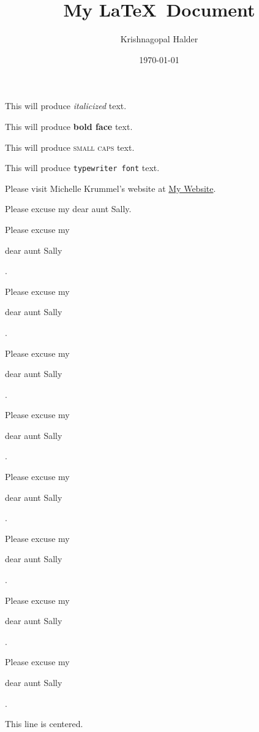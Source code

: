 \documentclass[12pt]{article}
\title{My \LaTeX\ Document}
\author{Krishnagopal Halder}
\date{\today}
\begin{document}
\tableofcontents
\maketitle

This will produce \textit{italicized} text.

This will produce \textbf{bold face} text.

This will produce \textsc{small caps} text.

This will produce \texttt{typewriter font} text.

Please visit Michelle Krummel's website at \href{http://michellekrummel.com}{My Website}.

\vspace{1cm}

Please excuse my dear aunt Sally.

Please excuse my \begin{large} dear aunt Sally \end{large}.

Please excuse my \begin{Large} dear aunt Sally \end{Large}.

Please excuse my \begin{huge} dear aunt Sally \end{huge}.

Please excuse my \begin{Huge} dear aunt Sally \end{Huge}.

Please excuse my \begin{normalsize} dear aunt Sally \end{normalsize}.

Please excuse my \begin{small} dear aunt Sally \end{small}.

Please excuse my \begin{scriptsize} dear aunt Sally \end{scriptsize}.

Please excuse my \begin{tiny} dear aunt Sally \end{tiny}.

\vspace{1cm}

\begin{center} This line is centered. \end{center}
    
\end{document}
